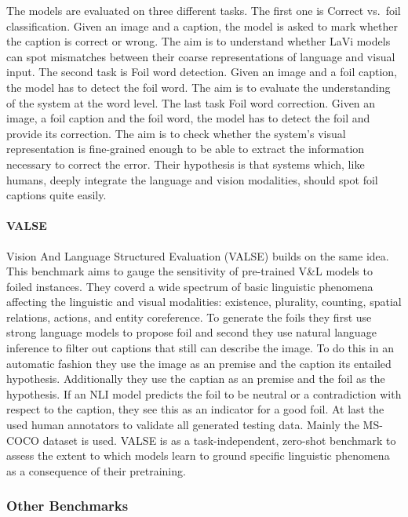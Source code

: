 \documentclass[
]{krantz}
\begin{document}
The models are evaluated on three different tasks. The first one is Correct vs.~foil classification. Given an image and a caption, the model is asked to mark whether the caption is correct or wrong. The aim is to understand whether LaVi models can spot mismatches between their coarse representations of language and visual input. The second task is Foil word detection. Given an image and a foil caption, the model has to detect the foil word. The aim is to evaluate the understanding of the system at the word level. The last task Foil word correction. Given an image, a foil caption and the foil word, the model has to detect the foil and provide its correction. The aim is to check whether the system's visual representation is fine-grained enough to be able to extract the information necessary to correct the error. Their hypothesis is that systems which, like humans, deeply integrate the language and vision modalities, should spot foil captions quite easily.

\hypertarget{valse}{%
\paragraph{VALSE}\label{valse}}

Vision And Language Structured Evaluation (VALSE) \citep{parcalabescu-etal-2022-valse} builds on the same idea. This benchmark aims to gauge the sensitivity of pre-trained V\&L models to foiled instances. They coverd a wide spectrum of basic linguistic phenomena affecting the linguistic and visual modalities: existence, plurality, counting, spatial relations, actions, and entity coreference. To generate the foils they first use strong language models to propose foil and second they use natural language inference to filter out captions that still can describe the image. To do this in an automatic fashion they use the image as an premise and the caption its entailed hypothesis. Additionally they use the captian as an premise and the foil as the hypothesis. If an NLI model predicts the foil to be neutral or a contradiction with respect to the caption, they see this as an indicator for a good foil. At last the used human annotators to validate all generated testing data. Mainly the MS-COCO dataset is used. VALSE is as a task-independent, zero-shot benchmark to assess the extent to which models learn to ground specific linguistic phenomena as a consequence of their pretraining.

\hypertarget{other-benchmarks}{%
\subsubsection{Other Benchmarks}\label{other-benchmarks}}
\end{document}
